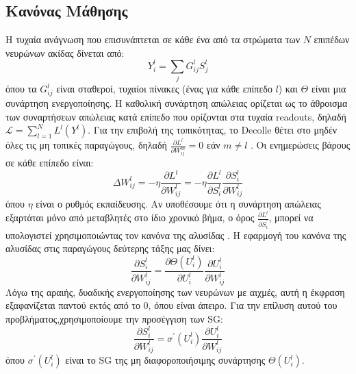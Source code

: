 \documentclass[12pt]{report}
\begin{document}
\subsection{Κανόνας Μάθησης}
Η τυχαία ανάγνωση που επισυνάπτεται σε κάθε ένα από τα στρώματα των $N$ επιπέδων νευρώνων ακίδας δίνεται από:
\begin{equation}
Y_{i}^{l}=\sum_{j} G_{i j}^{l} S_{j}^{l}
\end{equation}
όπου τα $G_{i j}^{l}$ είναι σταθεροί, τυχαίοι πίνακες (ένας για κάθε επίπεδο $l$) και $\Theta$  είναι μια συνάρτηση ενεργοποίησης. Η καθολική συνάρτηση απώλειας ορίζεται ως το άθροισμα των συναρτήσεων απώλειας κατά επίπεδο που ορίζονται στα τυχαία \textlatin{readouts}, δηλαδή $\mathcal{L}=\sum_{l=1}^{N} L^{l}\left(Y^{l}\right)$. Για την επιβολή της τοπικότητας, το \textlatin{Decolle} θέτει στο μηδέν όλες τις μη τοπικές παραγώγους, δηλαδή $\frac{\partial L^{l}}{\partial W_{i j}^{m}}=0$ εάν $m \neq l$ . Οι ενημερώσεις βάρους σε κάθε επίπεδο είναι:
\begin{equation}
\Delta W_{i j}^{l}=-\eta \frac{\partial L^{l}}{\partial W_{i j}^{l}}=-\eta \frac{\partial L^{l}}{\partial S_{i}^{l}} \frac{\partial S_{i}^{l}}{\partial W_{i j}^{l}}
\end{equation}
όπου $\eta$ είναι ο ρυθμός εκπαίδευσης. Αν υποθέσουμε ότι η συνάρτηση απώλειας εξαρτάται μόνο από μεταβλητές στο ίδιο χρονικό βήμα, ο όρος $\frac{\partial L^{l}}{\partial S_{i}^{\prime}}$, μπορεί να υπολογιστεί χρησιμοποιώντας τον κανόνα της αλυσίδας . Η εφαρμογή του κανόνα της αλυσίδας στις παραγώγους δεύτερης τάξης μας δίνει:
\begin{equation}
\frac{\partial S_{i}^{l}}{\partial W_{i j}^{l}}=\frac{\partial \Theta\left(U_{i}^{l}\right)}{\partial U_{i}^{l}} \frac{\partial U_{i}^{l}}{\partial W_{i j}^{l}}
\end{equation}
Λόγω της αραιής, δυαδικής ενεργοποίησης των νευρώνων με αιχμές, αυτή η έκφραση εξαφανίζεται παντού εκτός από το 0, όπου είναι άπειρο. Για την επίλυση αυτού του προβλήματος,χρησιμοποίουμε την προσέγγιση των \textlatin{SG}:
\begin{equation}
\frac{\partial S_{i}^{l}}{\partial W_{i j}^{l}}=\sigma^{\prime}\left(U_{i}^{l}\right) \frac{\partial U_{i}^{l}}{\partial W_{i j}^{l}}
\end{equation}
όπου $\sigma^{\prime}\left(U_{i}^{l}\right)$ είναι το \textlatin{SG} της μη διαφοροποιήσιμης συνάρτησης  $\Theta\left(U_{i}^{l}\right)$.
\end{document}
